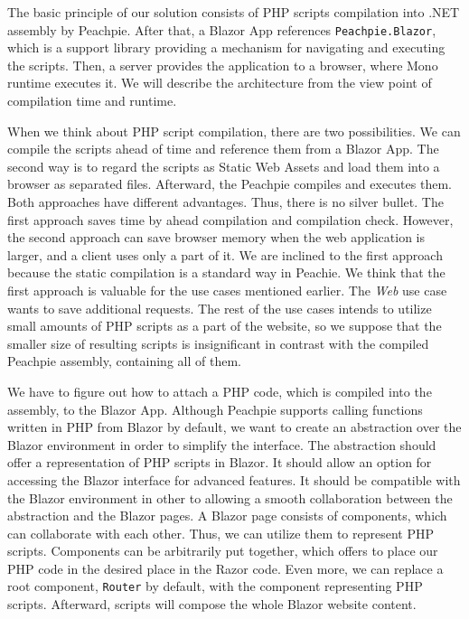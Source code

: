 The basic principle of our solution consists of PHP scripts compilation into .NET assembly by Peachpie.
After that, a Blazor App references \texttt{Peachpie.Blazor}, which is a support library providing a mechanism for navigating and executing the scripts.
Then, a server provides the application to a browser, where Mono runtime executes it.
We will describe the architecture from the view point of compilation time and runtime.
\par
When we think about PHP script compilation, there are two possibilities.
We can compile the scripts ahead of time and reference them from a Blazor App. 
The second way is to regard the scripts as Static Web Assets and load them into a browser as separated files.
Afterward, the Peachpie compiles and executes them.
Both approaches have different advantages. 
Thus, there is no silver bullet.
The first approach saves time by ahead compilation and compilation check.
However, the second approach can save browser memory when the web application is larger, and a client uses only a part of it.
We are inclined to the first approach because the static compilation is a standard way in Peachie.
We think that the first approach is valuable for the use cases mentioned earlier.
The \textit{Web} use case wants to save additional requests. 
The rest of the use cases intends to utilize small amounts of PHP scripts as a part of the website, so we suppose that the smaller size of resulting scripts is insignificant in contrast with the compiled Peachpie assembly, containing all of them. 
\par
We have to figure out how to attach a PHP code, which is compiled into the assembly, to the Blazor App.
Although Peachpie supports calling functions written in PHP from Blazor by default, we want to create an abstraction over the Blazor environment in order to simplify the interface.
The abstraction should offer a representation of PHP scripts in Blazor.
It should allow an option for accessing the Blazor interface for advanced features.
It should be compatible with the Blazor environment in other to allowing a smooth collaboration between the abstraction and the Blazor pages.
A Blazor page consists of components, which can collaborate with each other.
Thus, we can utilize them to represent PHP scripts.
Components can be arbitrarily put together, which offers to place our PHP code in the desired place in the Razor code.
Even more, we can replace a root component, \texttt{Router} by default, with the component representing PHP scripts.
Afterward, scripts will compose the whole Blazor website content.
